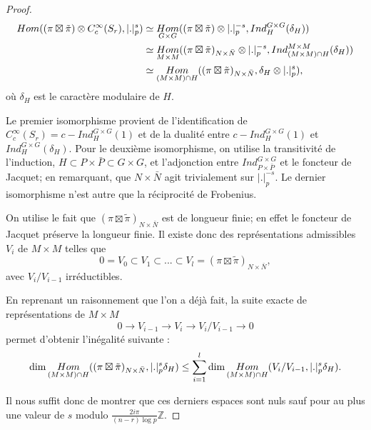 \documentclass{amsart}
\DeclareMathOperator{\Hom}{\mathnormal{Hom}}
\begin{document}
\begin{proof}
\begin{align}
\Hom( (\pi \boxtimes \tilde{\pi}) \otimes C_c^\infty(S_r), |.|_p^s) &\simeq \Hom_{G \times G}( (\pi \boxtimes \tilde{\pi}) \otimes |.|_p^{-s}, Ind_H^{G \times G}(\delta_H)) \\
&\simeq \Hom_{M \times M}( (\pi \boxtimes \tilde{\pi})_{N \times \bar{N}} \otimes |.|_p^{-s}, Ind_{(M \times M)\cap H}^{M \times M}(\delta_H)) \\
&\simeq \Hom_{(M \times M) \cap H}( (\pi \boxtimes \tilde{\pi})_{N \times \bar{N}}, \delta_H \otimes |.|_p^s),
\end{align}
où $\delta_H$ est le caractère modulaire de $H$.

Le premier isomorphisme provient de l'identification de $C_c^\infty(S_r)=c-Ind_H^{G \times G}(1)$ et de la dualité entre $c-Ind_H^{G \times G}(1)$ et $Ind_H^{G \times G}(\delta_H)$. Pour le deuxième isomorphisme, on utilise la transitivité de l'induction, $H \subset P \times \bar{P} \subset G \times G$, et l'adjonction entre $Ind_{P \times \bar{P}}^{G \times G}$ et le foncteur de Jacquet; en remarquant, que $N \times \bar{N}$ agit trivialement sur $|.|_p^{-s}$. Le dernier isomorphisme n'est autre que la réciprocité de Frobenius.

On utilise le fait que $(\pi \boxtimes \tilde{\pi})_{N \times \bar{N}}$ est de longueur finie; en effet le foncteur de Jacquet préserve la longueur finie. Il existe donc des représentations admissibles $V_i$ de $M \times M$ telles que
\begin{equation}
0=V_0 \subset V_1 \subset ... \subset V_l = (\pi \boxtimes \tilde{\pi})_{N \times \bar{N}},
\end{equation}
avec $V_i/V_{i-1}$ irréductibles.

En reprenant un raisonnement que l'on a déjà fait, la suite exacte de représentations de $M \times M$
\begin{equation}
0 \rightarrow V_{i-1} \rightarrow V_i \rightarrow V_i/V_{i-1} \rightarrow 0
\end{equation}
permet d'obtenir l'inégalité suivante :
\begin{equation}
\dim \Hom_{(M \times M)\cap H} ((\pi \boxtimes \tilde{\pi})_{N \times \bar{N}}, |.|_p^s\delta_H) \leq \sum_{i=1}^{l} \dim \Hom_{(M \times M)\cap H} (V_i/V_{i-1}, |.|_p^s\delta_H).
\end{equation}

Il nous suffit donc de montrer que ces derniers espaces sont nuls sauf pour au plus une valeur de $s$ modulo $\frac{2i\pi}{(n-r)\log p}\mathbb{Z}$.


\end{proof}
\end{document}
